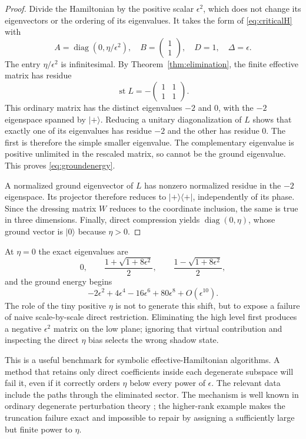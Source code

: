 \documentclass[11pt,oneside]{article}
\numberwithin{equation}{section}
\theoremstyle{plain}
\theoremstyle{definition}
\theoremstyle{remark}
\newcommand{\st}{\operatorname{st}}
\newcommand{\diag}{\operatorname{diag}}
\newcommand{\ket}[1]{\lvert#1\rangle}
\newcommand{\bra}[1]{\langle#1\rvert}
\newcommand{\proj}[1]{\ket{#1}\!\bra{#1}}
\begin{document}
\begin{proof}
Divide the Hamiltonian by the positive scalar $\epsilon^2$, which does not change its eigenvectors or the ordering of its eigenvalues. It takes the form of \eqref{eq:criticalH} with
\[
 A=\diag(0,\eta/\epsilon^2),\quad
 B=\begin{pmatrix}1\\1\end{pmatrix},\quad D=1,\quad\Delta=\epsilon.
\]
The entry $\eta/\epsilon^2$ is infinitesimal. By Theorem~\ref{thm:elimination}, the finite effective matrix has residue
\[
 \st L=-\begin{pmatrix}1&1\\1&1\end{pmatrix}.
\]
This ordinary matrix has the distinct eigenvalues $-2$ and $0$, with the $-2$ eigenspace spanned by $\ket{+}$. Reducing a unitary diagonalization of $L$ shows that exactly one of its eigenvalues has residue $-2$ and the other has residue $0$. The first is therefore the simple smaller eigenvalue. The complementary eigenvalue is positive unlimited in the rescaled matrix, so cannot be the ground eigenvalue. This proves \eqref{eq:groundenergy}.

A normalized ground eigenvector of $L$ has nonzero normalized residue in the $-2$ eigenspace. Its projector therefore reduces to $\proj{+}$, independently of its phase. Since the dressing matrix $W$ reduces to the coordinate inclusion, the same is true in three dimensions. Finally, direct compression yields $\diag(0,\eta)$, whose ground vector is $\ket{0}$ because $\eta>0$.
\end{proof}

At $\eta=0$ the exact eigenvalues are
\[
 0,\qquad \frac{1+\sqrt{1+8\epsilon^2}}2,\qquad
 \frac{1-\sqrt{1+8\epsilon^2}}2,
\]
and the ground energy begins
\[
 -2\epsilon^2+4\epsilon^4-16\epsilon^6+80\epsilon^8+O(\epsilon^{10}).
\]
The role of the tiny positive $\eta$ is not to generate this shift, but to expose a failure of naive scale-by-scale direct restriction. Eliminating the high level first produces a negative $\epsilon^2$ matrix on the low plane; ignoring that virtual contribution and inspecting the direct $\eta$ bias selects the wrong shadow state.

This is a useful benchmark for symbolic effective-Hamiltonian algorithms. A method that retains only direct coefficients inside each degenerate subspace will fail it, even if it correctly orders $\eta$ below every power of $\epsilon$. The relevant data include the paths through the eliminated sector. The mechanism is well known in ordinary degenerate perturbation theory \cite{BDL}; the higher-rank example makes the truncation failure exact and impossible to repair by assigning a sufficiently large but finite power to $\eta$.
\end{document}
